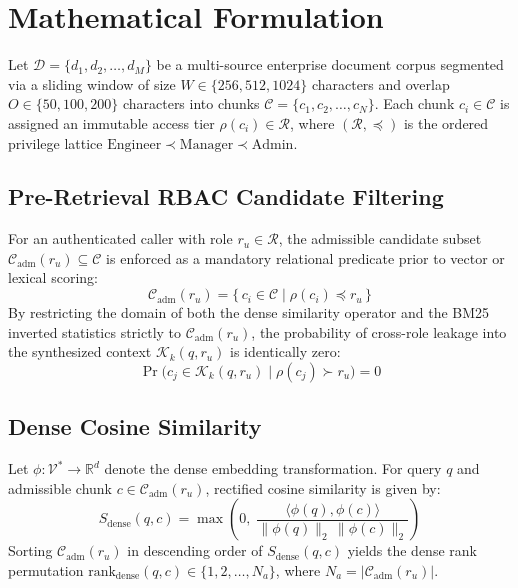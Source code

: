 \documentclass[conference]{IEEEtran}
\begin{document}
\section{Mathematical Formulation}

Let $\mathcal{D} = \{d_1, d_2, \dots, d_M\}$ be a multi-source enterprise document corpus segmented via a sliding window of size $W \in \{256, 512, 1024\}$ characters and overlap $O \in \{50, 100, 200\}$ characters into chunks $\mathcal{C} = \{c_1, c_2, \dots, c_N\}$. Each chunk $c_i \in \mathcal{C}$ is assigned an immutable access tier $\rho(c_i) \in \mathcal{R}$, where $(\mathcal{R}, \preceq)$ is the ordered privilege lattice $\text{Engineer} \prec \text{Manager} \prec \text{Admin}$.

\subsection{Pre-Retrieval RBAC Candidate Filtering}
For an authenticated caller with role $r_u \in \mathcal{R}$, the admissible candidate subset $\mathcal{C}_{\text{adm}}(r_u) \subseteq \mathcal{C}$ is enforced as a mandatory relational predicate prior to vector or lexical scoring:
\begin{equation}
\mathcal{C}_{\text{adm}}(r_u) = \bigl\{\, c_i \in \mathcal{C} \;\big|\; \rho(c_i) \preceq r_u \,\bigr\}
\label{eq:rbac}
\end{equation}
By restricting the domain of both the dense similarity operator and the BM25 inverted statistics strictly to $\mathcal{C}_{\text{adm}}(r_u)$, the probability of cross-role leakage into the synthesized context $\mathcal{K}_k(q, r_u)$ is identically zero:
\begin{equation}
\Pr\bigl(c_j \in \mathcal{K}_k(q, r_u) \;\big|\; \rho(c_j) \succ r_u\bigr) = 0
\end{equation}

\subsection{Dense Cosine Similarity}
Let $\phi: \mathcal{V}^* \to \mathbb{R}^d$ denote the dense embedding transformation. For query $q$ and admissible chunk $c \in \mathcal{C}_{\text{adm}}(r_u)$, rectified cosine similarity is given by:
\begin{equation}
S_{\text{dense}}(q, c) = \max\!\left(0,\; \frac{\langle \phi(q), \phi(c) \rangle}{\|\phi(q)\|_2 \, \|\phi(c)\|_2}\right)
\label{eq:cosine}
\end{equation}
Sorting $\mathcal{C}_{\text{adm}}(r_u)$ in descending order of $S_{\text{dense}}(q, c)$ yields the dense rank permutation $\text{rank}_{\text{dense}}(q, c) \in \{1, 2, \dots, N_a\}$, where $N_a = |\mathcal{C}_{\text{adm}}(r_u)|$.
\end{document}
